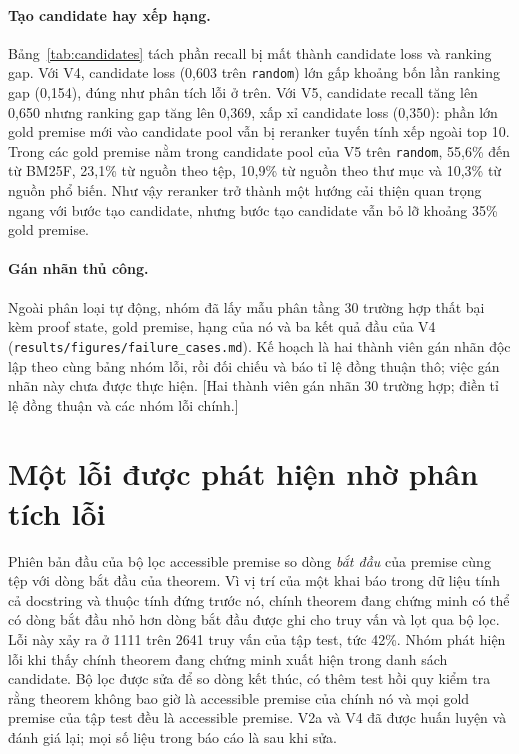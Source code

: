 \documentclass[11pt,a4paper,oneside]{report}
\newcommand{\code}[1]{\texttt{#1}}
\newcommand{\canchot}[1]{\textcolor{red!70!black}{[#1]}}
\begin{document}


\paragraph{Tạo candidate hay xếp hạng.} Bảng~\ref{tab:candidates} tách phần recall bị mất thành candidate loss và
ranking gap. Với V4, candidate loss (0,603 trên \code{random}) lớn gấp khoảng bốn lần ranking gap (0,154), đúng như phân
tích lỗi ở trên. Với V5, candidate recall tăng lên 0,650 nhưng ranking gap tăng lên 0,369, xấp xỉ candidate loss (0,350):
phần lớn gold premise mới vào candidate pool vẫn bị reranker tuyến tính xếp ngoài top 10. Trong các gold premise nằm trong candidate pool
của V5 trên \code{random}, 55,6\% đến từ BM25F, 23,1\% từ nguồn theo tệp, 10,9\% từ nguồn theo thư mục và 10,3\% từ nguồn phổ
biến. Như vậy reranker trở thành một hướng cải thiện quan trọng ngang với bước tạo candidate, nhưng bước tạo candidate vẫn bỏ
lỡ khoảng 35\% gold premise.



\paragraph{Gán nhãn thủ công.} Ngoài phân loại tự động, nhóm đã lấy mẫu phân tầng 30 trường hợp thất bại kèm proof state,
gold premise, hạng của nó và ba kết quả đầu của V4 (\code{results/figures/failure\_cases.md}). Kế hoạch là hai thành viên
gán nhãn độc lập theo cùng bảng nhóm lỗi, rồi đối chiếu và báo tỉ lệ đồng thuận thô; việc gán nhãn này chưa được thực
hiện. \canchot{Hai thành viên gán nhãn 30 trường hợp; điền tỉ lệ đồng thuận và các nhóm lỗi chính.}

\section{Một lỗi được phát hiện nhờ phân tích lỗi}\label{sec:bug}

Phiên bản đầu của bộ lọc accessible premise so dòng \emph{bắt đầu} của premise cùng tệp với dòng bắt đầu của theorem. Vì
vị trí của một khai báo trong dữ liệu tính cả docstring và thuộc tính đứng trước nó, chính theorem đang chứng minh có thể
có dòng bắt đầu nhỏ hơn dòng bắt đầu được ghi cho truy vấn và lọt qua bộ lọc. Lỗi này xảy ra ở \num{1111} trên
\num{2641} truy vấn của tập test, tức 42\%. Nhóm phát hiện lỗi khi thấy chính theorem đang chứng minh xuất hiện trong
danh sách candidate. Bộ lọc được sửa để so dòng kết thúc, có thêm test hồi quy kiểm tra rằng theorem không bao giờ là
accessible premise của chính nó và mọi gold premise của tập test đều là accessible premise. V2a và V4 đã được huấn luyện và đánh giá lại;
mọi số liệu trong báo cáo là sau khi sửa.
\end{document}
